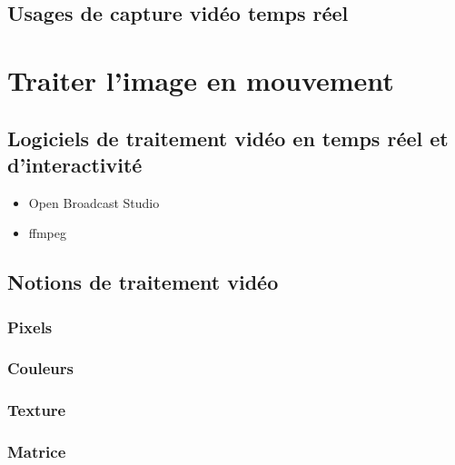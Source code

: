 \documentclass[
]{book}
\providecommand{\tightlist}{%
  \setlength{\itemsep}{0pt}\setlength{\parskip}{0pt}}
\begin{document}
\hypertarget{usages-de-capture-viduxe9o-temps-ruxe9el}{%
\section{Usages de capture vidéo temps réel}\label{usages-de-capture-viduxe9o-temps-ruxe9el}}

\hypertarget{traiter}{%
\chapter{Traiter l'image en mouvement}\label{traiter}}

\hypertarget{traiter_logiciels}{%
\section{Logiciels de traitement vidéo en temps réel et d'interactivité}\label{traiter_logiciels}}

\begin{itemize}
\tightlist
\item
  Open Broadcast Studio
\item
  ffmpeg
\end{itemize}

\hypertarget{notions-de-traitement-viduxe9o}{%
\section{Notions de traitement vidéo}\label{notions-de-traitement-viduxe9o}}

\hypertarget{pixels}{%
\subsection{Pixels}\label{pixels}}

\hypertarget{couleurs}{%
\subsection{Couleurs}\label{couleurs}}

\hypertarget{texture}{%
\subsection{Texture}\label{texture}}

\hypertarget{matrice}{%
\subsection{Matrice}\label{matrice}}
\end{document}
